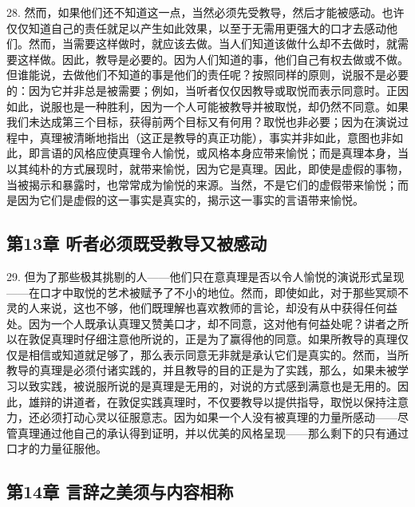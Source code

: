 28. 然而，如果他们还不知道这一点，当然必须先受教导，然后才能被感动。也许仅仅知道自己的责任就足以产生如此效果，以至于无需用更强大的口才去感动他们。然而，当需要这样做时，就应该去做。当人们知道该做什么却不去做时，就需要这样做。因此，教导是必要的。因为人们知道的事，他们自己有权去做或不做。但谁能说，去做他们不知道的事是他们的责任呢？按照同样的原则，说服不是必要的：因为它并非总是被需要；例如，当听者仅仅因教导或取悦而表示同意时。正因如此，说服也是一种胜利，因为一个人可能被教导并被取悦，却仍然不同意。如果我们未达成第三个目标，获得前两个目标又有何用？取悦也非必要；因为在演说过程中，真理被清晰地指出（这正是教导的真正功能），事实并非如此，意图也非如此，即言语的风格应使真理令人愉悦，或风格本身应带来愉悦；而是真理本身，当以其纯朴的方式展现时，就带来愉悦，因为它是真理。因此，即使是虚假的事物，当被揭示和暴露时，也常常成为愉悦的来源。当然，不是它们的虚假带来愉悦；而是因为它们是虚假的这一事实是真实的，揭示这一事实的言语带来愉悦。\par


\subsection{第13章 听者必须既受教导又被感动}

29. 但为了那些极其挑剔的人——他们只在意真理是否以令人愉悦的演说形式呈现——在口才中取悦的艺术被赋予了不小的地位。然而，即使如此，对于那些冥顽不灵的人来说，这也不够，他们既理解也喜欢教师的言论，却没有从中获得任何益处。因为一个人既承认真理又赞美口才，却不同意，这对他有何益处呢？讲者之所以在敦促真理时仔细注意他所说的，正是为了赢得他的同意。如果所教导的真理仅仅是相信或知道就足够了，那么表示同意无非就是承认它们是真实的。然而，当所教导的真理是必须付诸实践的，并且教导的目的正是为了实践，那么，如果未被学习以致实践，被说服所说的是真理是无用的，对说的方式感到满意也是无用的。因此，雄辩的讲道者，在敦促实践真理时，不仅要教导以提供指导，取悦以保持注意力，还必须打动心灵以征服意志。因为如果一个人没有被真理的力量所感动——尽管真理通过他自己的承认得到证明，并以优美的风格呈现——那么剩下的只有通过口才的力量征服他。\par


\subsection{第14章 言辞之美须与内容相称}

